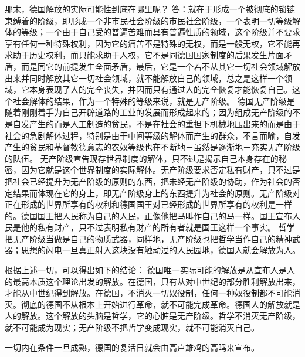 \begin{acknowledge}%

那末，德国解放的实际可能性到底在哪里呢？
      答：就在于形成一个被彻底的锁链束缚着的阶级，即形成一个非市民社会阶级的市民社会阶级，一个表明一切等级解体的等级；一个由于自己受的普遍苦难而具有普遍性质的领域，这个阶级并不要求享有任何一种特殊权利，因为它的痛苦不是特殊的无权，而是一般无权，它不能再求助于历史权利，而只能求助于人权，它不是同德国国家制度的后果发生片面矛盾，而是同它的前提发生全面矛盾，最后，它是一个若不从其它一切社会领域解放出来并同时解放其它一切社会领域，就不能解放自己的领域，总之是这样一个领域，它本身表现了人的完全丧失，并因而只有通过人的完全恢复才能恢复自己。这个社会解体的结果，作为一个特殊的等级来说，就是无产阶级。
      德国无产阶级是随着刚刚着手为自己开辟道路的工业的发展而形成起来的；因为组成无产阶级的不是自发产生的而是人工制造的贫民，不是在社会的重担下机械地压出来的而是由于社会的急剧解体过程，特别是由于中间等级的解体而产生的群众，不言而喻，自发产生的贫民和基督教德意志的农奴等级也在不断地－虽然是逐渐地－充实无产阶级的队伍。
      无产阶级宣告现存世界制度的解体，只不过是揭示自己本身存在的秘密，因为它就是这个世界制度的实际解体。无产阶级要求否定私有财产，只不过是把社会已经提升为无产阶级的原则的东西，把未经无产阶级的协助，作为社会的否定结果而体现在它的身上，即无产阶级身上的东西提升为社会的原则。无产阶级对正在形成的世界所享有的权利和德国国王对已经形成的世界所享有的权利是一样的。德国国王把人民称为自己的人民，正像他把马叫作自己的马一样。国王宣布人民是他的私有财产，只不过表明私有财产的所有者就是国王这样一个事实。
      哲学把无产阶级当做是自己的物质武器，同样地，无产阶级也把哲学当作自己的精神武器；思想的闪电一旦真正射入这块没有触动过的人民园地，德国人就会解放为人。

根据上述一切，可以得出如下的结论：
      德国唯一实际可能的解放是从宣布人是人的最高本质这个理论出发的解放。在德国，只有从对中世纪的部分胜利解放出来，才能从中世纪得到解放。在德国，不消灭一切奴役制，任何一种奴役制都不可能消灭。彻底的德国不从根本上开始进行革命，就不可能完成革命。德国人的解放就是人的解放。这个解放的头脑是哲学，它的心脏是无产阶级。哲学不消灭无产阶级，就不可能成为现实；无产阶级不把哲学变成现实，就不可能消灭自己。

一切内在条件一旦成熟，德国的复活日就会由高卢雄鸡的高鸣来宣布。
\end{acknowledge}
